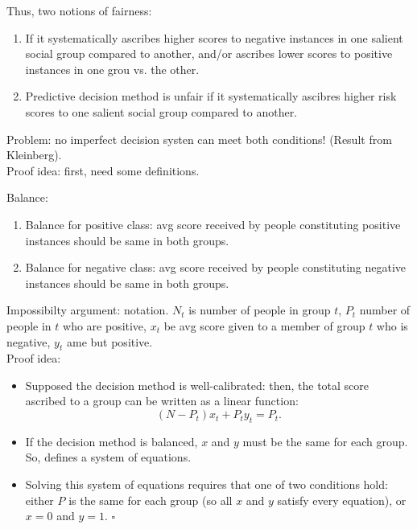 Thus, two notions of fairness:
\begin{enumerate}
\item If it systematically ascribes higher scores to negative instances in one salient social group compared to another, and/or ascribes lower scores to positive instances in one grou vs. the other. 
\item Predictive decision method is unfair if it systematically ascibres higher risk scores to one salient social group compared to another.
\end{enumerate}

Problem: no imperfect decision systen can meet both conditions! (Result from Kleinberg). \\

Proof idea: first, need some definitions.


Balance:
\begin{enumerate}
	\item Balance for positive class: avg score received by people constituting positive instances should be same in both groups.
	\item Balance for negative class: avg score received by people constituting negative instances should be same in both groups.
\end{enumerate}

Impossibilty argument: notation. $N_t$ is number of people in group $t$, $P_t$ number of people in $t$ who are positive, $x_t$ be avg score given to a member of group $t$ who is negative, $y_t$ ame but positive. \\

Proof idea:
\begin{itemize}
\item Supposed the decision method is well-calibrated: then, the total score ascribed to a group can be written as a linear function: 
\[
(N - P_t)x_t + P_t y_t = P_t.
\]
\item If the decision method is balanced, $x$ and $y$ must be the same for each group. So, defines a system of equations.
\item Solving this system of equations requires that one of two conditions hold: either $P$ is the same for each group (so all $x$ and $y$ satisfy every equation), or $x=0$ and $y=1$. $\square$
	\end{itemize}


